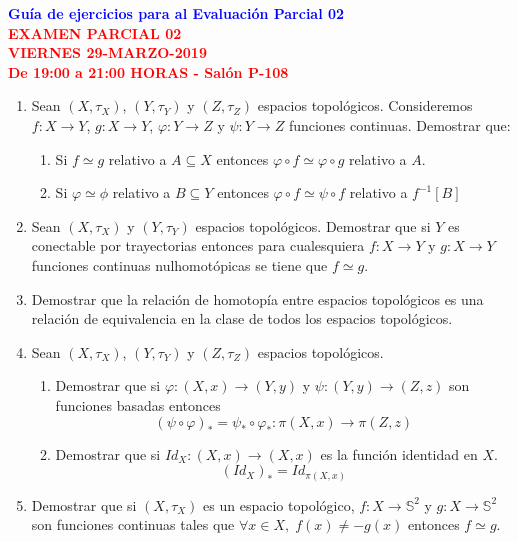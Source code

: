 \documentclass[12pt]{report}
\numberwithin{section}{chapter}
\newcommand{\s}{\mathbb S}
\begin{document}
\begin{center}
\textcolor{blue}{\textbf{\large Guía de ejercicios para al Evaluación Parcial 02}}\\
\vspace{0.5 cm}
\textcolor{red}{\textbf{\large EXAMEN PARCIAL 02 \\ VIERNES
29-MARZO-2019\\ De 19:00 a 21:00 HORAS - Salón P-108}}
\end{center}

\begin{enumerate}

\item Sean $(X,\tau_X)$, $(Y,\tau_Y)$ y $(Z, \tau_Z)$ espacios topológicos. Consideremos $f: X \to Y$, $g: X \to Y$, $\varphi: Y \to Z$ y $\psi: Y \to Z$ funciones continuas. Demostrar que:
\begin{enumerate}
\item Si $f \simeq g$ relativo a $A \subseteq X$ entonces $\varphi \circ f \simeq \varphi\circ g$ relativo a $A$.
\item Si $\varphi \simeq \phi$ relativo a $B\subseteq Y$ entonces $\varphi \circ f \simeq \psi \circ f$ relativo a $f^{-1}[B]$
\end{enumerate}

\item Sean $(X,\tau_X)$ y $(Y,\tau_Y)$ espacios topológicos. Demostrar que si $Y$ es conectable por trayectorias entonces para cualesquiera $f: X \to Y$ y $g : X\to Y$ funciones continuas nulhomotópicas se tiene que $f\simeq g$.

\item Demostrar que la relación de homotopía entre espacios topológicos es una relación de equivalencia en la clase de todos los espacios topológicos.

\item Sean $(X,\tau_X)$, $(Y,\tau_Y)$ y $(Z, \tau_Z)$ espacios topológicos.
\begin{enumerate}
\item Demostrar que si $\varphi: (X,x) \to (Y,y)$ y $\psi: (Y,y) \to (Z,z)$ son funciones basadas entonces
$$(\psi \circ \varphi)_* = \psi_*\circ \varphi_* : \pi(X,x)\to \pi(Z,z)$$

\item Demostrar que si $Id_X: (X,x)\to (X,x)$ es la función identidad en $X$.
$$(Id_X)_* = Id_{\pi(X,x)}$$
\end{enumerate}

\item Demostrar que si $(X, \tau_X)$ es un espacio topológico, $f : X \to \s^2$ y $g :X \to \s^2$ son funciones continuas tales que $\forall x\in X,\; f(x)\neq - g(x)$ entonces $f\simeq g$.


\end{enumerate}
\end{document}
